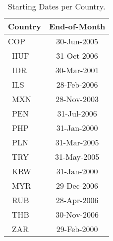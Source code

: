 \begin{table}
	\centering
	\begin{tabular}{lc}
\toprule
\textbf{Country}&\textbf{End-of-Month}\\\midrule
{ COP}&30-Jun-2005\\\
HUF&31-Oct-2006\\\
IDR&30-Mar-2001\\\
ILS&28-Feb-2006\\\
MXN&28-Nov-2003\\\
PEN&31-Jul-2006\\\
PHP&31-Jan-2000\\\
PLN&31-Mar-2005\\\
TRY&31-May-2005\\\
KRW&31-Jan-2000\\\
MYR&29-Dec-2006\\\
RUB&28-Apr-2006\\\
THB&30-Nov-2006\\\
ZAR&29-Feb-2000\\ \bottomrule
\end{tabular}
\\
\caption{Starting Dates per Country.}\label{tab:start_dates}
\end{table}